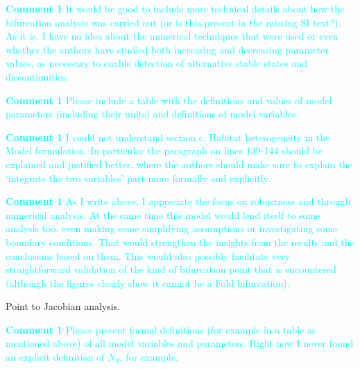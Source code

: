 \documentclass[ucm,12pt]{ucletter}
\newcounter{section}
\begin{document}
\begin{letter}
\noindent \textcolor{cyan}{
{\bf Comment 1} It would be good to include more technical details about how the bifurcation analysis was carried out (or is this present in the missing SI text?). As it is, I have no idea about the numerical techniques that were used or even whether the authors have studied both increasing and decreasing parameter values, as necessary to enable detection of alternative stable states and discontinuities.
}

\noindent \textcolor{cyan}{
{\bf Comment 1} Please include a table with the definitions and values of model parameters (including their units) and definitions of model variables.
}

\noindent \textcolor{cyan}{
{\bf Comment 1} I could not understand section c, Habitat heterogeneity in the Model formulation. In particular the paragraph on lines 139-144 should be explained and justified better, where the authors should make sure to explain the ‘integrate the two variables’ part more formally and explicitly.
}

\noindent \textcolor{cyan}{
{\bf Comment 1} As I write above, I appreciate the focus on robustness and through numerical analysis. At the same time this model would lend itself to some analysis too, even making some simplifying assumptions or investigating some boundary conditions. That would strengthen the insights from the results and the conclusions based on them. This would also possibly facilitate very straightforward validation of the kind of bifurcation point that is encountered (although the figures clearly show it cannot be a Fold bifurcation).
}

Point to Jacobian analysis.

\noindent \textcolor{cyan}{
{\bf Comment 1} Please present formal definitions (for example in a table as mentioned above) of all model variables and parameters. Right now I never found an explicit definition of $N_T$, for example.
}



\end{letter}
\end{document}
